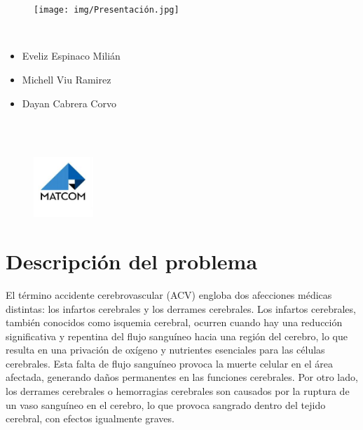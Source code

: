 \documentclass[a4paper, 12pt]{article}
\begin{document}
\graphicspath{{./}}

\begin{center}
\\
\vspace {1cm}
\\

\begin{figure}[H]
    \centering
    \texttt{[image: img/Presentación.jpg]}
\end{figure}

\\
\begin{itemize}
\centering
\item Eveliz Espinaco Milián
\item Michell Viu Ramirez
\item Dayan Cabrera Corvo
\end{itemize}
\vspace {0.5cm}
\\
\\

\begin{figure}[H]
    \centering
    \includegraphics[width=0.2\textwidth]{img/MATCOM.jpg}
\end{figure}



\end{center}

\newpage
\tableofcontents

\newpage
\section{Descripción del problema}
El término accidente cerebrovascular (ACV) engloba dos afecciones médicas distintas: los infartos cerebrales y los derrames cerebrales. Los infartos cerebrales, también conocidos como isquemia cerebral, ocurren cuando hay una reducción significativa y repentina del flujo sanguíneo hacia una región del cerebro, lo que resulta en una privación de oxígeno y nutrientes esenciales para las células cerebrales. Esta falta de flujo sanguíneo provoca la muerte celular en el área afectada, generando daños permanentes en las funciones cerebrales. Por otro lado, los derrames cerebrales o hemorragias cerebrales son causados por la ruptura de un vaso sanguíneo en el cerebro, lo que provoca sangrado dentro del tejido cerebral, con efectos igualmente graves.
\end{document}

